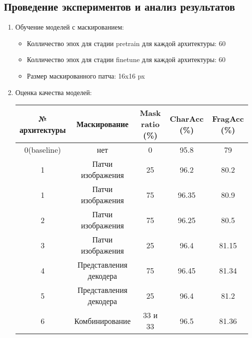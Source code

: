 \subsection{Проведение  экспериментов  и  анализ  результатов}

\begin{enumerate}
     \item   Обучение  моделей  с  маскированием:
     \begin{itemize}
          \item  Колличество эпох для стадии pretrain для каждой архитектуры: 60
          \item  Колличество эпох для стадии finetune для каждой архитектуры: 60
          \item  Размер маскированного патча: 16x16 px
     \end{itemize}

     \item  Оценка  качества  моделей:
          \begin{table}[H]
               \begin{tabular}{|c|c|c|c|c|}
               \hline
               № архитектуры & Маскирование & Mask ratio (\%) & CharAcc (\%) & FragAcc (\%) \\ \hline
               0(baseline) & нет & 0 & 95.8 & 79 \\ \hline
               1 & Патчи изображения & 25 & 96.2 & 80.2 \\ \hline
               1 & Патчи изображения & 75 & 96.35 & 80.9 \\ \hline
               2 & Патчи изображения & 75 & 96.25 & 80.5 \\ \hline
               3 & Патчи изображения & 25 & 96.4 & 81.15 \\ \hline
               4 & Представления декодера & 75 & 96.45 & 81.34 \\ \hline
               5 & Представления декодера & 25 & 96.4 & 81.2 \\ \hline
               6 & Комбинирование & 33 и 33 & 96.5 & 81.36 \\ \hline
               \end{tabular}
          \end{table}


\end{enumerate}
